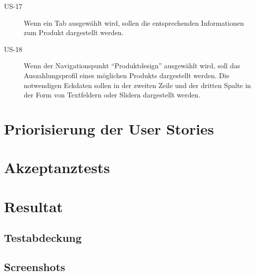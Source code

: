 \begin{description}
\item[US-17]
Wenn ein Tab ausgewählt wird, sollen die entsprechenden Informationen zum
Produkt dargestellt werden.

\item[US-18]
Wenn der Navigationspunkt ``Produktdesign'' ausgewählt wird, soll das
Auszahlungsprofil eines möglichen Produkts dargestellt werden. Die notwendigen
Eckdaten sollen in der zweiten Zeile und der dritten Spalte in der Form von
Textfeldern oder Slidern dargestellt werden.
\end{description}

\section{Priorisierung der User Stories}

\section{Akzeptanztests}

\section{Resultat}

\subsection{Testabdeckung}

\subsection{Screenshots}